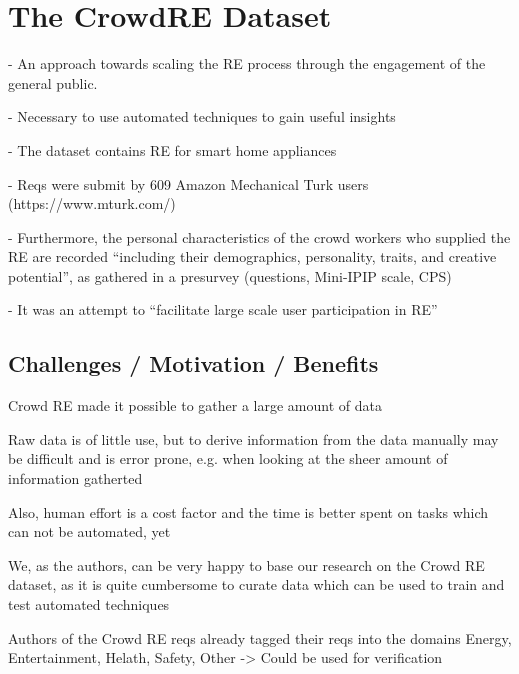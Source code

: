 \section{The CrowdRE Dataset}
- An approach towards scaling the RE process through the engagement of the general public. 

- Necessary to use automated techniques to gain useful insights 

- The dataset contains RE for smart home appliances 

- Reqs were submit by 609 Amazon Mechanical Turk users (https://www.mturk.com/) 

- Furthermore, the personal characteristics of the crowd workers who supplied the RE are recorded “including their demographics, personality, traits, and creative potential”, as gathered in a presurvey (questions, Mini-IPIP scale, CPS)  

- It was an attempt to “facilitate large scale user participation in RE” \cite{murukannaiah_toward_2017}

\subsection{Challenges / Motivation / Benefits}
Crowd RE made it possible to gather a large amount of data 

Raw data is of little use, but to derive information from the data manually may be difficult and is error prone, e.g. when looking at the sheer amount of information gatherted 

Also, human effort is a cost factor and the time is better spent on tasks which can not be automated, yet 

We, as the authors, can be very happy to base our research on the Crowd RE dataset, as it is quite cumbersome to curate data which can be used to train and test automated techniques 

Authors of the Crowd RE reqs already tagged their reqs into the domains Energy, Entertainment, Helath, Safety, Other -> Could be used for verification